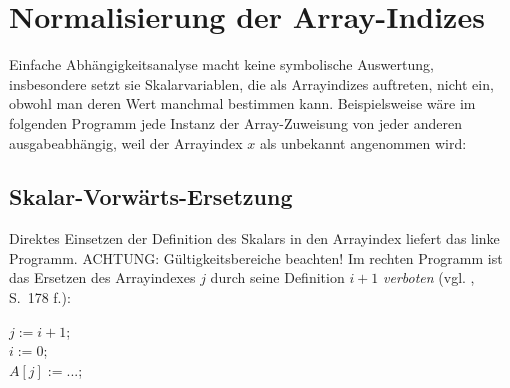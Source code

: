 
\section{Normalisierung der Array-Indizes}

Einfache Abhängigkeitsanalyse macht keine symbolische Auswertung,
insbesondere setzt sie Skalarvariablen, die als Arrayindizes auftreten,
nicht ein, obwohl man deren Wert manchmal bestimmen kann. Beispielsweise
wäre im folgenden Programm jede Instanz der Array-Zuweisung von jeder
anderen ausgabeabhängig, weil der Arrayindex $x$ als unbekannt
angenommen wird:


\begin{procedure}
\SetAlgoLined
{}
\end{procedure}

\subsection{Skalar-Vorwärts-Ersetzung}
\label{sec:sve}

Direktes Einsetzen der Definition des Skalars in den Arrayindex liefert
das linke Programm. ACHTUNG: Gültigkeitsbereiche beachten! Im rechten
Programm ist das Ersetzen des Arrayindexes $j$ durch seine Definition
$i+1$ \emph{verboten} (vgl. \cite{Zima90}, S.~178 f.):\\[1cm]
\begin{minipage}{.4\textwidth}
    \begin{algorithm}[H]
    \end{algorithm}
\end{minipage}
\begin{minipage}{.4\textwidth}
    \begin{algorithm}[H]
    $j := i+1$;\\
    $i := 0$;\\
    $A[j] := ...$;\\
    \end{algorithm}
\end{minipage}

